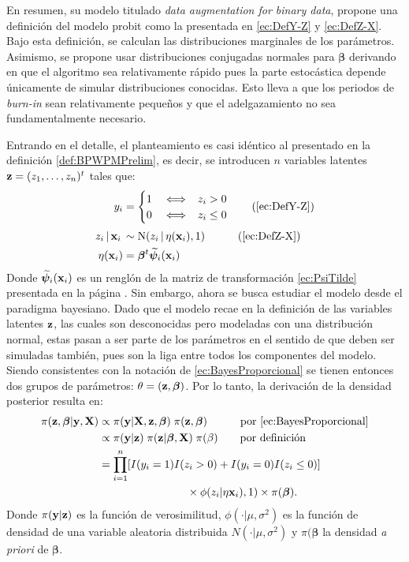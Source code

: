 \documentclass[../Main/Main.tex]{subfiles}
\begin{document}
En resumen, su modelo titulado \textit{data augmentation for binary data}, propone una definición del modelo probit como la presentada en \eqref{ec:DefY-Z} y \eqref{ec:DefZ-X}. Bajo esta definición, se calculan las distribuciones marginales de los parámetros. Asimismo, se propone usar distribuciones conjugadas normales para $\bm{\beta}$ derivando en que el algoritmo sea relativamente rápido pues la parte estocástica depende únicamente de simular distribuciones conocidas. Esto lleva a que los periodos de \textit{burn-in} sean relativamente pequeños y que el adelgazamiento no sea fundamentalmente necesario.

Entrando en el detalle, el planteamiento es casi idéntico al presentado en la definición \ref{def:BPWPMPrelim}, es decir, se introducen $n$ variables latentes $\mathbf{z} = (z_1,\ldots,z_n)^t$ tales que:
\begin{align}
y_i &= 
	\begin{cases}
		1 & \iff \enspace z_i > 0 \\									0 & \iff \enspace z_i \leq 0
	\end{cases} \tag{\ref{ec:DefY-Z}} \\[2pt]
z_i\,|\,\xni\, &\sim \text{N}(z_i\,|\,\eta(\xni),1)\quad \tag{\ref{ec:DefZ-X}}  \\
	\eta(\xni) &= \bm{\beta}^t\xnpsi \label{ec:EtaFinal}
\end{align}
Donde $\widetilde{\bm{\psi}}_i(\mathbf{x}_i)$ es un renglón de la matriz de transformación \eqref{ec:PsiTilde} presentada en la página \pageref{ec:PsiTilde}.
Sin embargo, ahora se busca estudiar el modelo desde el paradigma bayesiano. Dado que el modelo recae en la definición de las variables latentes $\mathbf{z}$, las cuales son desconocidas pero modeladas con una distribución normal, estas pasan a ser parte de los parámetros en el sentido de que deben ser simuladas también, pues son la liga entre todos los componentes del modelo. Siendo consistentes con la notación de \eqref{ec:BayesProporcional} se tienen entonces dos grupos de parámetros:  $\theta = (\mathbf{z}, \bm{\beta})$. Por lo tanto, la derivación de la densidad posterior resulta en:
\begin{align}
	\pi(\mathbf{z}, \bm{\beta}| \mathbf{y}, \mathbf{X})
		& \propto \pi(\mathbf{y} | \mathbf{X}, \mathbf{z}, \bm{\beta}) 
		\; \pi(\mathbf{z}, \bm{\beta}) \quad\qquad\text{por \eqref{ec:BayesProporcional}}\nonumber \\
	& \propto \pi(\mathbf{y} | \mathbf{z})\; \pi(\mathbf{z}|\bm{\beta},\mathbf{X}) 
		\; \pi(\beta) \qquad\text{por definición} \nonumber \\
	& = \prod_{i = 1}^n[I(y_i = 1)I(z_i > 0) +
		 I(y_i = 0)I(z_i \leq 0)] \nonumber \\
		 &\qquad\qquad\qquad\qquad\times \phi(z_i|\eta{\mathbf{x}_i)},1) 				\times \pi(\bm{\beta}). \label{ec:BayesChibbPosterior}
\end{align}
Donde $\pi(\mathbf{y} | \mathbf{z})$ es la función de verosimilitud, $\phi(\cdot|\mu,\sigma^2)$ es la función de densidad de una variable aleatoria distribuida $N(\cdot|\mu,\sigma^2)$ y $\pi(\bm{\beta}$ la densidad \textit{a priori} de $\bm{\beta}$.
\end{document}
